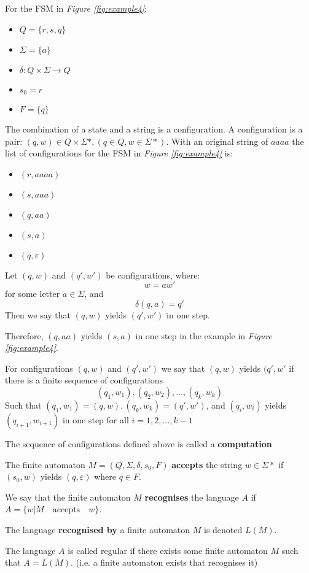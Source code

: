 \documentclass[11pt, A4]{article}
\begin{document}
For the FSM in \emph{Figure \ref{fig:example4}}:
\begin{itemize}
  \item $Q = \{r, s, q\}$
  \item $\Sigma = \{a\}$
  \item $\delta : Q \times \Sigma \to Q$
  \item $s_0 = r$
  \item $F = \{q\}$
\end{itemize}

The combination of a state and a string is a configuration.
A configuration is a pair: $(q, w) \in Q \times \Sigma\ast, (q \in Q, w \in
\Sigma\ast)$.
With an original string of $aaaa$ the list of configurations for the FSM in
\emph{Figure \ref{fig:example4}} is:

\begin{itemize}
  \item $(r, aaaa)$
  \item $(s, aaa)$
  \item $(q, aa)$
  \item $(s, a)$
  \item $(q, \varepsilon)$
\end{itemize}

Let $(q, w)$ and $(q', w')$ be configurations, where:
$$w = aw'$$
for some letter $a \in \Sigma$, and
$$\delta(q, a) = q'$$
Then we say that $(q, w)$ yields $(q', w')$ in one step.

Therefore, $(q, aa)$ yields $(s, a)$ in one step in the example in \emph{Figure
\ref{fig:example4}}.

For configurations $(q, w)$ and $(q', w')$ we say that $(q, w)$ yields $(q', w'$
if there is a finite sequence of configurations
$$(q_1, w_1), (q_2, w_2), ..., (q_k, w_k)$$
Such that $(q_1, w_1)=(q,w), (q_k, w_k)=(q',w')$, and
$(q_i, w_i)$ yields $(q_{i+1}, w_{i+1})$ in one step for all $i=1, 2, ..., k-1$

The sequence of configurations defined above is called a \textbf{computation}

The finite automaton $M=(Q, \Sigma, \delta, s_0, F)$ \textbf{accepts} the string
$w \in \Sigma\ast$ if $(s_0, w)$ yields $(q, \varepsilon)$ where $q \in F$.

We say that the finite automaton $M$ \textbf{recognises} the language $A$ if
$A=\{w|M \quad \mathrm{accepts} \quad w\}$.

The language \textbf{recognised by} a finite automaton $M$ is denoted $L(M)$.

The language $A$ is called regular if there exists some finite automaton $M$
such that $A = L(M)$. (i.e. a finite automaton exists that recognises it)
\end{document}
